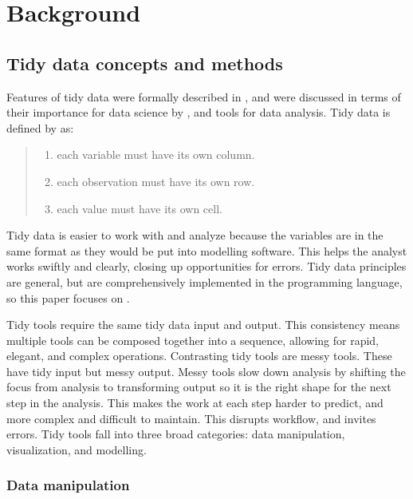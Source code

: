 \documentclass[
]{jss}
\providecommand{\tightlist}{%
  \setlength{\itemsep}{0pt}\setlength{\parskip}{0pt}}
\begin{document}
\hypertarget{background}{%
\section{Background}\label{background}}

\hypertarget{tidy-data-concepts}{%
\subsection{Tidy data concepts and methods}\label{tidy-data-concepts}}

Features of tidy data were formally described in \citet{Wickham2014}, and were discussed in terms of their importance for data science by \citet{Donoho2017}, and tools for data analysis. Tidy data is defined by \citet{r4ds} as:

\begin{quote}
\begin{enumerate}
\def\labelenumi{\arabic{enumi}.}
\tightlist
\item
  each variable must have its own column.
\item
  each observation must have its own row.
\item
  each value must have its own cell.
\end{enumerate}
\end{quote}

Tidy data is easier to work with and analyze because the variables are in the same format as they would be put into modelling software. This helps the analyst works swiftly and clearly, closing up opportunities for errors. Tidy data principles are general, but are comprehensively implemented in the  programming language, so this paper focuses on  \citep{rcore}.

Tidy tools require the same tidy data input and output. This consistency means multiple tools can be composed together into a sequence, allowing for rapid, elegant, and complex operations. Contrasting tidy tools are messy tools. These have tidy input but messy output. Messy tools slow down analysis by shifting the focus from analysis to transforming output so it is the right shape for the next step in the analysis. This makes the work at each step harder to predict, and more complex and difficult to maintain. This disrupts workflow, and invites errors. Tidy tools fall into three broad categories: data manipulation, visualization, and modelling.

\hypertarget{tidy-data-manip}{%
\subsubsection{Data manipulation}\label{tidy-data-manip}}
\end{document}
